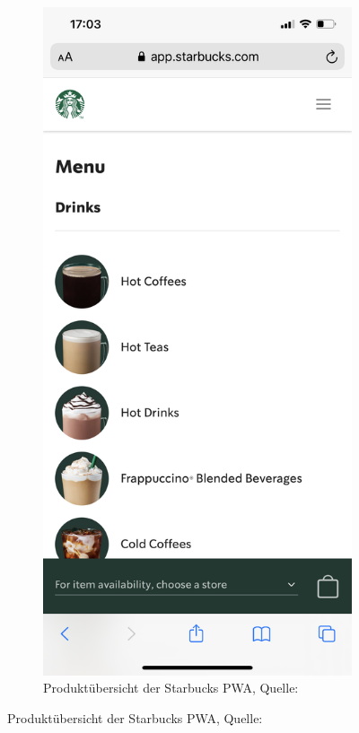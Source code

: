 \begin{figure}[h]
\begin{subfigure}[b]{0.4\textwidth}
		\label{img: Startseite der Starbucks PWA}
	\end{subfigure}
	\hfill
	\begin{subfigure}[b]{0.4\textwidth}
		\includegraphics[scale=0.15]{images/starbucks_angebot.PNG}
		\caption[Produktübersicht der Starbucks \gls{PWA}]{Produktübersicht der Starbucks \gls{PWA}, Quelle: \cite{starbucksPwaMenu}}
		\label{img: Produktübersicht der Starbucks PWA}
	\end{subfigure}
\end{figure}
\newpage
